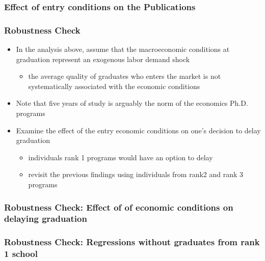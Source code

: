 \documentclass[11pt]{beamer}
\begin{document}
{
	\begin{frame}
		\frametitle{Effect of entry conditions on the Publications}
		
	\end{frame}
}


\begin{frame}[label = robustness]
	\frametitle{Robustness Check}
	\begin{itemize}
	\item In the analysis above,  assume that the macroeconomic conditions at graduation represent an exogenous labor demand shock
	\begin{itemize}
		\item  the average quality of graduates who enters the market is not systematically associated with the economic conditions
		\end{itemize}
	\vspace{1 mm}
	\item Note that five years of study is arguably the norm of the economics Ph.D. programs	
	\vspace{1 mm}
	\item Examine the effect of the entry economic conditions on one's decision to delay graduation %
	\begin{itemize}
		\item individuals rank 1 programs would have an option to delay 
		\item revisit the previous findings using individuals from rank2 and rank 3 programs %
	\end{itemize}
\end{itemize}
\end{frame}


{
	\begin{frame}[label = delay]
		\frametitle{Robustness Check: Effect of of economic conditions on delaying graduation}
		 
	\end{frame}
}

{
	\begin{frame}[label = rank2]
		\frametitle{Robustness Check: Regressions without graduates from rank 1 school}
		 
	\end{frame}
}
\end{document}
